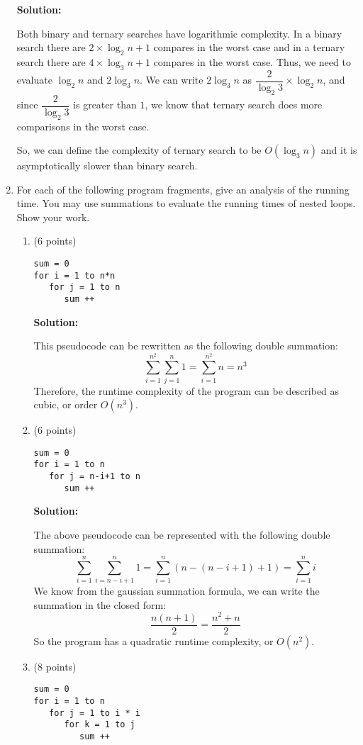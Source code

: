 \documentclass[11pt]{article}
\begin{document}
\begin{enumerate}
\textbf{Solution: }

Both binary and ternary searches have logarithmic complexity.  In a binary search there are $2 \times \log_2 n + 1$ compares in the worst case and in a ternary search there are $4 \times \log_3 n + 1$ compares in the worst case.  Thus, we need to evaluate $\log_2 n$ and $2 \log_3 n$.  We can write $2 \log_3 n$ as $\dfrac{2}{\log_2 3} \times \log_2 n$, and since $\dfrac{2}{\log_2 3}$ is greater than $1$, we know that ternary search does more comparisons in the worst case.  

So, we can define the complexity of ternary search to be $O(\log_3 n)$ and it is asymptotically slower than binary search.  
   
\item For each of the following program fragments, give an analysis of 
the running time. You may use summations to evaluate the running times 
of nested loops. Show your work.

\begin{enumerate}

\item (6 points) 
\begin{verbatim}
sum = 0
for i = 1 to n*n
   for j = 1 to n
      sum ++
\end{verbatim}

\textbf{Solution: }

This pseudocode can be rewritten as the following double summation:
$$ \sum_{i=1}^{n^2} \sum_{j=1}^{n} 1 = \sum_{i=1}^{n^2} n = n^3$$
Therefore, the runtime complexity of the program can be described as cubic, or order $O(n^3)$.  

\newpage
\item (6 points)
\begin{verbatim}
sum = 0
for i = 1 to n
   for j = n-i+1 to n
      sum ++
\end{verbatim}

\textbf{Solution: }

The above pseudocode can be represented with the following double summation:
$$ \sum_{i=1}^{n} \sum_{i=n-i+1}^{n} 1 = \sum_{i=1}^{n} (n-(n-i+1)+1) = \sum_{i=1}^{n} i $$
We know from the gaussian summation formula, we can write the summation in the closed form: 
$$ \frac{n(n+1)}{2} = \frac{n^2+n}{2}$$
So the program has a quadratic runtime complexity, or $O(n^2)$.  

\item (8 points)
\begin{verbatim}
sum = 0
for i = 1 to n
   for j = 1 to i * i
      for k = 1 to j
         sum ++
\end{verbatim}


\end{enumerate}
\end{enumerate}
\end{document}
